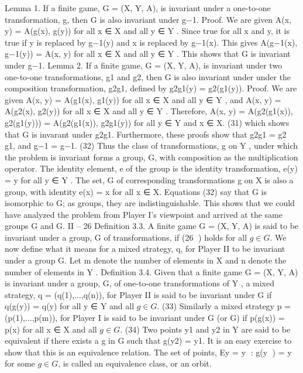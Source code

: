 \documentclass[]{report}
\begin{document}
Lemma 1. If a finite game, G = (X, Y, A), is invariant under a one-to-one transformation,
g, then G is also invariant under g−1.
Proof. We are given A(x, y) = A(g(x), g(y)) for all x ∈ X and all y ∈ Y . Since true for
all x and y, it is true if y is replaced by g−1(y) and x is replaced by g−1(x). This gives
A(g−1(x), g−1(y)) = A(x, y) for all x ∈ X and all y ∈ Y . This shows that G is invariant
under g−1.
Lemma 2. If a finite game, G = (X, Y, A), is invariant under two one-to-one transformations,
g1 and g2, then G is also invariant under under the composition transformation,
g2g1, defined by g2g1(y) = g2(g1(y)).
Proof. We are given A(x, y) = A(g1(x), g1(y)) for all x ∈ X and all y ∈ Y , and A(x, y) =
A(g2(x), g2(y)) for all x ∈ X and all y ∈ Y . Therefore,
A(x, y) = A(g2(g1(x)), g2(g1(y))) = A(g2(g1(x)), g2g1(y)) for all y ∈ Y and x ∈ X.
(31)
which shows that G is invarant under g2g1.
Furthermore, these proofs show that
g2g1 = g2 g1, and g−1 = g−1. (32)
Thus the class of transformations, g on Y , under which the problem is invariant forms a
group, G, with composition as the multiplication operator. The identity element, e of the
group is the identity transformation, e(y) = y for all y ∈ Y . The set, G of corresponding
transformations g on X is also a group, with identity e(x) = x for all x ∈ X. Equations
(32) say that G is isomorphic to G; as groups, they are indistinguishable.
This shows that we could have analyzed the problem from Player I’s viewpoint and
arrived at the same groups G and G.
II – 26
Definition 3.3. A finite game G = (X, Y, A) is said to be invariant under a group, G of
transformations, if (26
) holds for all $g \in G$.
We now define what it means for a mixed strategy, q, for Player II to be invariant
under a group G. Let m denote the number of elements in X and n denote the number of
elements in Y .
Definition 3.4. Given that a finite game G = (X, Y, A) is invariant under a group, G,
of one-to-one transformations of Y , a mixed strategy, q = (q(1),...,q(n)), for Player II is
said to be invariant under G if
q(g(y)) = q(y) for all y ∈ Y and all $g \in G$. (33)
Similarly a mixed strategy p = (p(1),...,p(m)), for Player I is said to be invariant under
G (or G) if
p(g(x)) = p(x) for all x ∈ X and all $g \in G$. (34)
Two points y1 and y2 in Y are said to be equivalent if there exists a g in G such that
g(y2) = y1. It is an easy exercise to show that this is an equivalence relation. The set of
points, Ey = {y : g(y
) = y for some $g \in G$}, is called an equivalence class, or an orbit.
\end{document}
